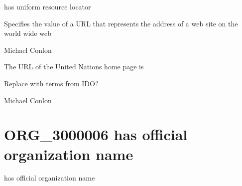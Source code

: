 \documentclass[letterpaper,10pt,english]{sphinxmanual}
\begin{document}
\begin{sphinxShadowBox}

\sphinxAtStartPar
has uniform resource locator
\end{sphinxShadowBox}

\begin{sphinxShadowBox}

\sphinxAtStartPar
Specifies the value of a URL that represents the address of a web site on the world wide web
\end{sphinxShadowBox}

\begin{sphinxShadowBox}

\sphinxAtStartPar
Michael Conlon 
\end{sphinxShadowBox}

\begin{sphinxShadowBox}

\sphinxAtStartPar
The URL of the United Nations home page is 
\end{sphinxShadowBox}

\begin{sphinxShadowBox}

\sphinxAtStartPar
Replace with terms from IDO?
\end{sphinxShadowBox}

\begin{sphinxShadowBox}

\sphinxAtStartPar
Michael Conlon 
\end{sphinxShadowBox}
\begin{quote}

\ignorespaces \end{quote}


\section{ORG\_3000006 \sphinxhyphen{} has official organization name}
\label{\detokenize{doc-ORG_3000006:org-3000006-has-official-organization-name}}\label{\detokenize{doc-ORG_3000006:index-0}}\label{\detokenize{doc-ORG_3000006::doc}}
\begin{sphinxShadowBox}

\sphinxAtStartPar
has official organization name
\end{sphinxShadowBox}
\end{document}
